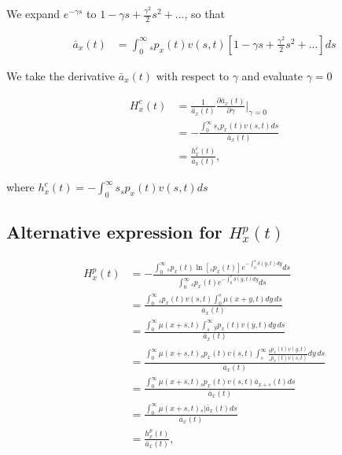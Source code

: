 \documentclass[12pt]{article}
\begin{document}
We expand $e^{-\gamma s}$ to $1-\gamma s+\frac{\gamma^2}{2} s^{2} +...$, so that


\begin{equation}\label{eq:EntropyConst2}
\begin{split}
\bar{a}_{x}(t) &= \int_0^\infty {}_sp_x(t) {v}(s,t)[1-\gamma s+\frac{\gamma^2}{2} s^{2} +...]ds
\end{split}
\end{equation}

We take the derivative $\bar{a}_{x}(t)$ with respect to $\gamma$ and evaluate $\gamma=0$


\begin{equation}\label{eq:EntropyConst3}
\begin{split}
{H}^{c}_x(t)&=\frac{1}{\bar{a}_x(t)}\frac{\partial \bar{a}_x(t)}{\partial \gamma} \bigg\rvert_{\gamma=0}\\
&= -\frac{\int_0^\infty s {}_sp_x(t) {v}(s,t)ds}{\bar{a}_x(t)} \\
&= \frac{{h}^{c}_x(t)}{\bar{a}_x(t)},
\end{split}
\end{equation}

where ${h}^{c}_x(t)=-\int_0^\infty s {}_sp_x(t) {v}(s,t)ds$



\subsection{Alternative expression for ${H}^{p}_{x}(t)$}\label{sec:EntropyAlt}

\begin{equation} \label{eq:EntropyAnnuityA1}
\begin{split}
{H}^{p}_{x}(t) &= -\frac{ \int_{0}^{\infty}{}_sp_x(t)\ln[{}_sp_x(t)] e^{-\int_{0}^{s}\delta(y,t)dy} ds}{\int_0^\infty {}_sp_x(t) e^{-\int_{0}^{s}\delta(y,t)dy} ds}\\
&= \frac{\int_0^\infty {}_sp_x(t) {v}(s,t) \int_0^s \mu(x+y,t) dy\,ds}{\bar{a}_x(t)}\\
&= \frac{\int_0^\infty  \mu(x+s,t) \int_s^\infty {}_yp_x(t) {v}(y,t)  dy\,ds}{\bar{a}_x(t)}\\
&= \frac{\int_0^\infty  \mu(x+s,t)  {}_sp_x(t) {v}(s,t) \int_s^\infty \frac{ {}_yp_x(t) {v}(y,t)}{ {}_sp_x(t) {v}(s,t)}  dy\,ds}{\bar{a}_x(t)}\\
&=  \frac{\int_0^\infty \mu(x+s,t)   {}_sp_x(t) {v}(s,t) \bar{a}_{x+s}(t) ds}{\bar{a}_x(t)} \\
&=  \frac{\int_0^\infty \mu(x+s,t)  {}_s|\bar{a}_x(t) ds}{\bar{a}_x(t)} \\
&=  \frac{{h}^{p}_{x}(t)}{\bar{a}_x(t)}, \\
\end{split}
\end{equation}
\end{document}
